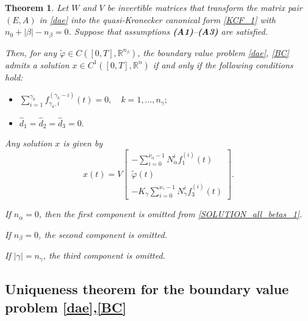 \documentclass[preprint,12pt]{elsarticle}
\numberwithin{equation}{section}
\newtheorem{theorem}{Theorem}[section]
\theoremstyle{definition}
\begin{document}
\begin{theorem}\label{Th1_second_case}
Let \( W \) and \( V \) be invertible matrices that transform the matrix pair \( (E, A) \) in \eqref{dae} into the quasi-Kronecker canonical form \eqref{KCF_1} with 
\( n_0 + |\beta| - n_\beta = 0 \).
Suppose that assumptions \textnormal{\textbf{(A1)}--\textbf{(A3)}} are satisfied. 

Then, for any \( \widetilde{\varphi} \in C([0,T],\mathbb{R}^{n_{\beta}}) \), the boundary value problem \eqref{dae}, \eqref{BC} admits a solution \( x \in C^1([0,T],\mathbb{R}^n) \) if and only if the following conditions hold:
\begin{itemize}
    \item[\emph{(a)}] 
        \(
        \sum\limits_{i=1}^{\gamma_k} f_{\gamma_k,i}^{(\gamma_k - i)}(t) = 0,\quad  k = 1,\ldots,n_{\gamma};
        \)
    \item[\emph{(b)}] 
    $
    \widehat{d}_1 =\widehat{d}_2 = \widehat{d}_3 = 0.
    $
\end{itemize}

Any solution \( x \) is given by
\begin{equation}\label{SOLUTION_all_betas_1}
    x(t) = V
\begin{bmatrix}
 -\sum\limits_{i=0}^{\nu_{\alpha} - 1} N_{\alpha}^i f_1^{(i)}(t) \\
 \widetilde{\varphi}(t) \\
 -K_{\gamma} \sum\limits_{i=0}^{\nu_{\gamma} - 1} N_{\gamma}^i f_3^{(i)}(t)
\end{bmatrix}.
\end{equation}

If \( n_\alpha =0 \), then the first component is omitted from \eqref{SOLUTION_all_betas_1}.

If \( n_{\beta} = 0 \), the second component is omitted.

If \( |\gamma| = n_{\gamma} \), the third component is omitted.
\end{theorem}








\subsection{Uniqueness theorem for the boundary value problem \eqref{dae},\eqref{BC}}
\end{document}
